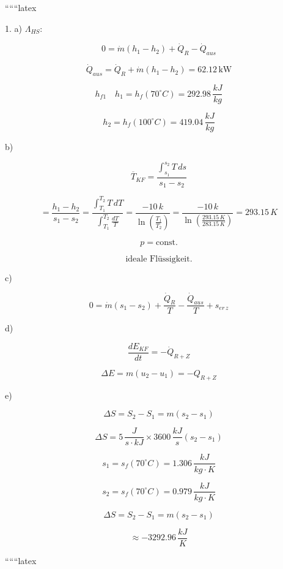 
``````latex


1. a) \(\Lambda_{HS}:\)

\[
0 = \dot{m} (h_1 - h_2) + \dot{Q}_R - \dot{Q}_{aus}
\]

\[
\dot{Q}_{aus} = \dot{Q}_R + \dot{m} (h_1 - h_2) = 62.12 \, \text{kW}
\]

\[
h_{f1} \quad h_1 = h_f (70^\circ C) = 292.98 \, \frac{kJ}{kg}
\]

\[
h_2 = h_f (100^\circ C) = 419.04 \, \frac{kJ}{kg}
\]

b)

\[
\overline{T}_{KF} = \frac{\int_{s_1}^{s_2} T \, ds}{s_1 - s_2}
\]

\[
= \frac{h_1 - h_2}{s_1 - s_2} = \frac{\int_{T_1}^{T_2} T \, dT}{\int_{T_1}^{T_2} \frac{dT}{T}} = \frac{-10 \, k}{\ln \left( \frac{T_1}{T_2} \right)} = \frac{-10 \, k}{\ln \left( \frac{293.15 \, K}{283.15 \, K} \right)} = 293.15 \, K
\]

\[
p = \text{const.}
\]

\[
\text{ideale Flüssigkeit.}
\]

c)

\[
0 = \dot{m} (s_1 - s_2) + \frac{\dot{Q}_R}{T} - \frac{\dot{Q}_{aus}}{T} + s_{er \, z}
\]

d)

\[
\frac{dE_{KF}}{dt} = -\dot{Q}_{R+Z}
\]

\[
\Delta E = m (u_2 - u_1) = -Q_{R+Z}
\]

e)

\[
\Delta S = S_2 - S_1 = m (s_2 - s_1)
\]

\[
\Delta S = 5 \, \frac{J}{s \cdot kJ} \times 3600 \, \frac{kJ}{s} (s_2 - s_1)
\]

\[
s_1 = s_f (70^\circ C) = 1.306 \, \frac{kJ}{kg \cdot K}
\]

\[
s_2 = s_f (70^\circ C) = 0.979 \, \frac{kJ}{kg \cdot K}
\]

\[
\Delta S = S_2 - S_1 = m (s_2 - s_1)
\]

\[
\approx -3292.96 \, \frac{kJ}{K}
\]

``````latex


